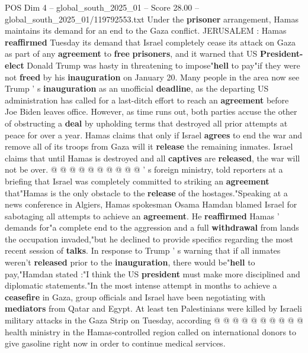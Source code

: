 \begin{textsample}{POS Dim 4 – global\_south\_2025\_01 – Score 28.00 – global\_south\_2025\_01/119792553.txt}  \label{ex:f4_pos_006}
Under the \textbf{prisoner} arrangement, Hamas maintains its demand for an end to the Gaza conflict.
JERUSALEM : Hamas \textbf{reaffirmed} Tuesday its demand that Israel completely cease its attack on Gaza as part of any \textbf{agreement} to \textbf{free} \textbf{prisoners}, and it warned that US \textbf{President-elect} Donald Trump was hasty in threatening to impose"\textbf{hell} to pay"if they were not \textbf{freed} by his \textbf{inauguration} on January 20.
Many people in the area now see Trump ' s \textbf{inauguration} as an unofficial \textbf{deadline}, as the departing US administration has called for a last-ditch effort to reach an \textbf{agreement} before Joe Biden leaves office.
However, as time runs out, both parties accuse the other of obstructing a \textbf{deal} by upholding terms that destroyed all prior attempts at peace for over a year.
Hamas claims that only if Israel \textbf{agrees} to end the war and remove all of its troops from Gaza will it \textbf{release} the remaining inmates.
Israel claims that until Hamas is destroyed and all \textbf{captives} are \textbf{released}, the war will not be over. @ @ @ @ @ @ @ @ @ @ ' s foreign ministry, told reporters at a briefing that Israel was completely committed to striking an \textbf{agreement} that"Hamas is the only obstacle to the \textbf{release} of the hostages."Speaking at a news conference in Algiers, Hamas spokesman Osama Hamdan blamed Israel for sabotaging all attempts to achieve an \textbf{agreement}.
He \textbf{reaffirmed} Hamas ' demands for"a complete end to the aggression and a full \textbf{withdrawal} from lands the occupation invaded,"but he declined to provide specifics regarding the most recent session of \textbf{talks}.
In response to Trump ' s warning that if all inmates weren't \textbf{released} prior to the \textbf{inauguration}, there would be"\textbf{hell} to pay,"Hamdan stated :"I think the US \textbf{president} must make more disciplined and diplomatic statements."In the most intense attempt in months to achieve a \textbf{ceasefire} in Gaza, group officials and Israel have been negotiating with \textbf{mediators} from Qatar and Egypt.
At least ten Palestinians were killed by Israeli military attacks in the Gaza Strip on Tuesday, according @ @ @ @ @ @ @ @ @ @ health ministry in the Hamas-controlled region called on international donors to give gasoline right now in order to continue medical services.

\end{textsample}
